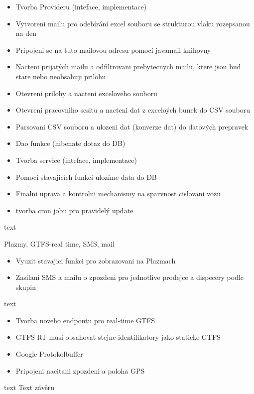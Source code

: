 \begin{itemize}
	\setlength{\parskip}{0pt}
	\setlength{\itemsep}{0pt}
	\item Tvorba Provideru (inteface, implementace)
	\item Vytvoreni mailu pro odebírání excel souboru se strukturou vlaku rozepsanou na den
	\item Pripojeni se na tuto mailovou adresu pomocí javamail knihovny
	\item Nacteni prijatých mailu a odfiltrovani prebytecnych mailu, ktere jsou bud stare nebo neobsahuji prilohu
	\item Otevreni prilohy a nacteni exceloveho souboru
	\item Otevreni pracovniho sesitu a nacteni dat z exceloých bunek do CSV souboru
	\item Parsovani CSV souboru a ulozeni dat (konverze dat) do datových prepravek
	\item Dao funkce (hibenate dotaz do DB)
	\item Tvorba service (inteface, implementace)
	\item Pomocí stavajicích funkci ulozíme data do DB
	\item Finalni uprava a kontrolni mechanismy na sparvnost cislovani vozu
	\item tvorba cron jobu pro pravidelý update
\end{itemize}

text

Plazmy, GTFS-real time, SMS, mail

\begin{itemize}
	\item Vyuzit stavajici funkci pro zobrazovani na Plazmach
	\item Zasilani SMS a mailu o zpozdeni pro jednotlive prodejce a dispecery podle skupin
\end{itemize}

text

\begin{itemize}
	\item Tvorba noveho endpontu pro real-time GTFS
	\item GTFS-RT musi obsahovat stejne identifikatory jako staticke GTFS
	\item Google Protokolbuffer
	\item Pripojeni nacitani zpozdeni a poloha GPS
\end{itemize}

text
Text závěru



